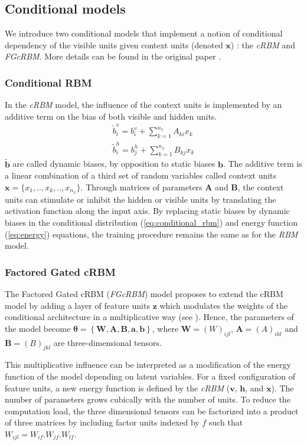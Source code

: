 \documentclass{article}
\begin{document}
\subsection{Conditional models}
We introduce two conditional models that implement a notion of conditional dependency of the visible units given context units (denoted $\bm{x}$) :  the \textit{cRBM} and \textit{FGcRBM}. More details can be found in the original paper \cite{taylor2009factored}.

\subsubsection{Conditional RBM}
In the \textit{cRBM} model, the influence of the context units is implemented by an additive term on the bias of both visible and hidden units.
\begin{align}
\tilde{b}_i^v = b_i^v + \sum_{k=1}^{n_x} A_{ki} x_k\\
\tilde{b}_i^h = b_j^h + \sum_{k=1}^{n_x} B_{kj} x_k
\end{align}
$\tilde{\bm{b}}$ are called dynamic biases, by opposition to static biases $\bm{b}$. The additive term is a linear combination of a third set of random variables called context units $\bm{x} = \{ x_1, .., x_k, .., x_{n_x} \}$.
Through matrices of parameters $\bm{A}$ and $\bm{B}$, the context units can stimulate or inhibit the hidden or visible units by translating the activation function along the input axis. By replacing static biases by dynamic biases in the conditional distribution (\ref{eq:conditional_rbm}) and energy function (\ref{eq:energy}) equations, the training procedure remains the same as for the \textit{RBM} model.

\subsubsection{Factored Gated cRBM}
The Factored Gated cRBM (\textit{FGcRBM}) model  \cite{taylor2009factored} proposes to extend the cRBM model by adding a layer of feature units $\bm{z}$ which modulates the weights of the conditional architecture in a multiplicative way (see ). Hence, the parameters of the model become $\bm{\theta} = \left\lbrace \bm{W} , \bm{A} , \bm{B} , \bm{a} , \bm{b} \right\rbrace$, where $\bm{W} = (W)_{ijl}$, $\bm{A}=(A)_{ikl}$ and $\bm{B}=(B)_{jkl}$ are three-dimensional tensors.

This multiplicative influence can be interpreted as a modification of the energy function of the model depending on latent variables. For a fixed configuration of feature units, a new energy function is defined by the \textit{cRBM} ($\bm{v}$, $\bm{h}$, and $\bm{x}$). The number of parameters grows cubically with the number of units. To reduce the computation load, the three dimensional tensors can be factorized into a product of three matrices by including factor units indexed by $f$ such that $W_{ijl} = W_{if} . W_{jf} . W_{lf}$.
\end{document}
